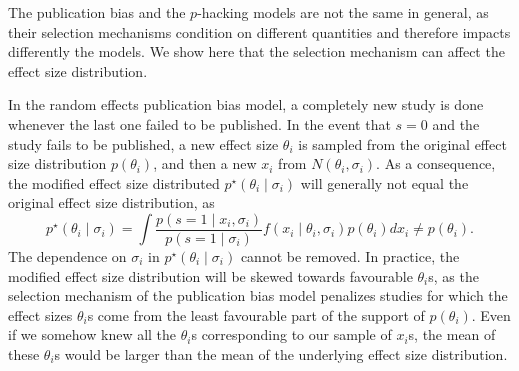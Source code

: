 \documentclass[useAMS,usenatbib,referee]{biom}
\begin{document}
The publication bias and the $p$-hacking models are not the same in general, as their selection mechanisms condition on different quantities and therefore impacts differently the models. We show here that the selection mechanism can affect the effect size distribution.

In the random effects publication bias model, a completely new study is done whenever the last one failed to be published. In the event that $s=0$ and the study fails to be published, a new effect size $\theta_i$ is sampled from the original effect size distribution $p(\theta_i)$, and then a new $x_i$ from $N(\theta_i,\sigma_i)$. As a consequence, the modified effect size distributed $p^\star(\theta_i\mid \sigma_i)$ will generally not equal the original effect size distribution, as
\[
p^\star(\theta_i\mid \sigma_i)=\int\frac{p(s=1\mid x_i, \sigma_i)}{p(s=1\mid\sigma_i)}f(x_i \mid \theta_i, \sigma _i) p(\theta_i) dx_i\neq p(\theta_i).
\]
The dependence on $\sigma_i$ in $p^\star(\theta_i\mid \sigma_i)$ cannot be removed. In practice, the modified effect size distribution will be skewed towards favourable $\theta_i$s, as the selection mechanism of the publication bias model penalizes studies for which the effect sizes $\theta_i$s come from the least favourable part of the support of $p(\theta_i)$. Even if we somehow knew all the $\theta_i$s corresponding to our sample of $x_i$s, the mean of these $\theta_i$s would be larger than the mean of the underlying effect size distribution. %


\end{document}
